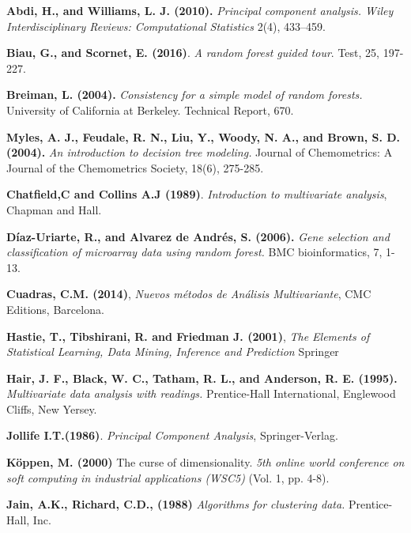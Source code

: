 
\begin{thebibliography}{99}
	

 \textbf{Abdi, H., and Williams, L. J. (2010).} \textit{Principal component analysis. Wiley Interdisciplinary Reviews: Computational Statistics}  2(4), 433–459. 

\textbf{Biau, G., and Scornet, E. (2016)}. \textit{A random forest guided tour}. Test, 25, 197-227.

\textbf{Breiman, L. (2004).}\textit{ Consistency for a simple model of random forests.} University of California at Berkeley. Technical Report, 670.

 \textbf{Myles, A. J., Feudale, R. N., Liu, Y., Woody, N. A., and Brown, S. D. (2004).} \textit{An introduction to decision tree modeling.} Journal of Chemometrics: A Journal of the Chemometrics Society, 18(6), 275-285.

 \textbf{Chatfield,C and Collins A.J (1989)}. {\em Introduction to multivariate analysis}, Chapman and Hall.

\textbf{Díaz-Uriarte, R., and Alvarez de Andrés, S. (2006).} \textit{Gene selection and classification of microarray data using random forest.} BMC bioinformatics, 7, 1-13.

 \textbf{Cuadras, C.M. (2014)}, \textit{Nuevos métodos de Análisis Multivariante}, CMC Editions, Barcelona. 

 \textbf{Hastie, T., Tibshirani, R. and Friedman J. (2001)}, \textit{The Elements of Statistical Learning, Data Mining, Inference and Prediction} Springer 

\textbf{Hair, J. F., Black, W. C., Tatham, R. L., and Anderson, R. E. (1995).}
\textit{ Multivariate data analysis with readings.} Prentice-Hall International, Englewood Cliffs, New Yersey. 

 \textbf{Jollife I.T.(1986)}. {\em Principal Component Analysis}, Springer-Verlag.

 \textbf{Köppen, M. (2000)} The curse of dimensionality. \textit{5th online world conference on soft computing in industrial applications (WSC5)}  (Vol. 1, pp. 4-8).


 \textbf{Jain, A.K., Richard, C.D., (1988)} \textit{Algorithms for clustering data.} Prentice-Hall, Inc. 


\end{thebibliography}
